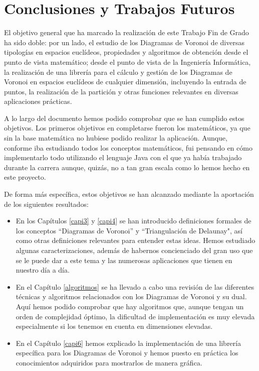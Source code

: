 \chapter{Conclusiones y Trabajos Futuros}


El objetivo general que ha marcado la realización de este Trabajo Fin de Grado ha sido doble: por un lado, el estudio de los Diagramas de Voronoi de diversas tipologías en espacios euclídeos, propiedades y algoritmos de obtención desde el punto de vista matemático; desde el punto de vista de la Ingeniería Informática, la realización de una librería para el cálculo y gestión de los Diagramas de Voronoi en espacios euclídeos de cualquier dimensión, incluyendo la entrada de puntos, la realización de la partición y otras funciones relevantes en diversas aplicaciones prácticas. 
\vspace{0.3cm}

A lo largo del documento hemos podido comprobar que se han cumplido estos objetivos. Los primeros objetivos en completarse fueron los matemáticos, ya que sin la base matemática no hubiese podido realizar la aplicación. Aunque, conforme iba estudiando todos los conceptos matemáticos, fui pensando en cómo implementarlo todo utilizando el lenguaje Java con el que ya había trabajado durante la carrera aunque, quizás, no a tan gran escala como lo hemos hecho en este proyecto. 
\vspace{0.3cm}

De forma más específica, estos objetivos se han alcanzado mediante la aportación de los siguientes resultados: 

\begin{itemize}
    \item En los Capítulos \ref{capi3} y \ref{capi4} se han introducido definiciones formales de los conceptos ``Diagramas de Voronoi'' y ``Triangulación de Delaunay", así como otras definiciones relevantes para entender estas ideas. Hemos estudiado algunas caracterizaciones, además de habernos concienciado del gran uso que se le puede dar a este tema y las numerosas aplicaciones que tienen en nuestro día a día.
    \item En el Capítulo \ref{algoritmos} se ha llevado a cabo una revisión de las diferentes técnicas y algoritmos relacionados con los Diagramas de Voronoi y su dual. Aquí hemos podido comprobar que hay algoritmos que, aunque tengan un orden de complejidad óptimo, la dificultad de implementación es muy elevada especialmente si los tenemos en cuenta en dimensiones elevadas.
    \item En el Capítulo \ref{capi6} hemos explicado la implementación de una librería específica para los Diagramas de Voronoi y hemos puesto en práctica los conocimientos adquiridos para mostrarlos de manera gráfica.
\end{itemize}



